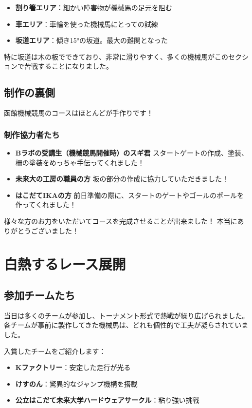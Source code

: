 \begin{itemize}
  \item \textbf{割り箸エリア}：細かい障害物が機械馬の足元を阻む
  \item \textbf{車エリア}：車輪を使った機械馬にとっての試練
  \item \textbf{坂道エリア}：傾き15°の坂道。最大の難関となった
\end{itemize}

特に坂道は木の板でできており、非常に滑りやすく、多くの機械馬がこのセクションで苦戦することになりました。

\section{制作の裏側}
函館機械競馬のコースはほとんどが手作りです！

\subsection{制作協力者たち}
\begin{itemize}
  \item \textbf{Bラボの受講生（機械競馬開催時）のスギ君}  
  スタートゲートの作成、塗装、柵の塗装をめっちゃ手伝ってくれました！
  
  \item \textbf{未来大の工房の職員の方}  
  坂の部分の作成に協力していただきました！
  
  \item \textbf{はこだてIKAの方}  
  前日準備の際に、スタートのゲートやゴールのポールを作ってくれました！
\end{itemize}

様々な方のお力をいただいてコースを完成させることが出来ました！  
本当にありがとうございました！

\chapter{白熱するレース展開}
\section{参加チームたち}
当日は多くのチームが参加し、トーナメント形式で熱戦が繰り広げられました。  
各チームが事前に製作してきた機械馬は、どれも個性的で工夫が凝らされていました。

入賞したチームをご紹介します：
\begin{itemize}
  \item \textbf{Kファクトリー}：安定した走行が光る
  \item \textbf{けすのん}：驚異的なジャンプ機構を搭載
  \item \textbf{公立はこだて未来大学ハードウェアサークル}：粘り強い挑戦
\end{itemize}

